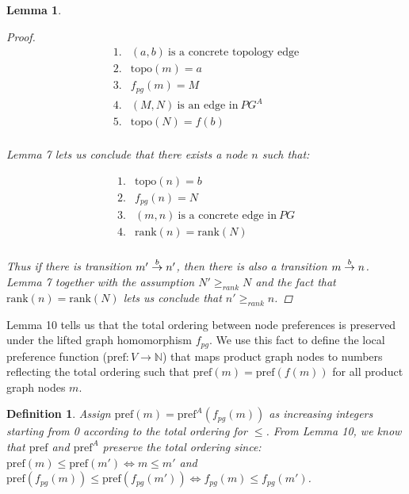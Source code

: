 \documentclass[twocolumn, openany]{sig-alternate-10pt}
\newcommand{\Pref}{\ensuremath{\mathrm{pref}}}
\newcommand{\Topo}{\ensuremath{\mathrm{topo}}}
\newcommand{\Rank}{\ensuremath{\mathrm{rank}}}
\newtheorem{defn}{Definition}
\newtheorem{lem}[thm]{Lemma}
\begin{document}
\begin{lem}
\begin{proof}
    \[ \begin{array}{ll}
      1. & (a,b) ~\text{is a concrete topology edge} \\
      2. & \Topo(m) = a \\
      3. & f_{pg}(m) = M \\
      4. & (M,N) ~\text{is an edge in}~ PG^A \\
      5. & \Topo(N) = f(b) \\
    \end{array} \]

    \noindent
    Lemma 7 lets us conclude that there exists a node $n$ such that:

    \[ \begin{array}{ll}
      1. & \Topo(n) = b \\
      2. & f_{pg}(n) = N \\
      3. & (m,n) ~\text{is a concrete edge in}~ PG \\
      4. & \Rank(n) = \Rank(N) \\
    \end{array} \] 

    \noindent
    Thus if there is transition $\trans{m'}{n'}{b}$, then there is also a transition $\trans{m}{n}{b}$. 
    Lemma 7 together with the assumption $N' \geq_{rank} N$ and the fact that $\Rank(n) = \Rank(N)$ lets us conclude that $n' \geq_{rank} n$.

  \end{proof}

\end{lem}


\vspace{1em}
Lemma 10 tells us that the total ordering between node preferences is preserved under the lifted graph homomorphism $f_{pg}$. 
We use this fact to define the local preference function ($\Pref : V \rightarrow \mathbb{N}$) that maps product graph nodes to numbers reflecting the total ordering such that $\Pref(m) = \Pref(f(m))$ for all product graph nodes $m$.

\vspace{1em}
\begin{defn}
  Assign $\Pref(m) = \Pref^A(f_{pg}(m))$ as increasing integers starting from 0 according to the total ordering for $\leq$.
  From Lemma 10, we know that $\Pref$ and $\Pref^A$ preserve the total ordering since: $\Pref(m) \leq \Pref(m') \iff m \leq m'$ and $\Pref(f_{pg}(m)) \leq \Pref(f_{pg}(m')) \iff f_{pg}(m) \leq f_{pg}(m')$.
\end{defn}
\end{document}
